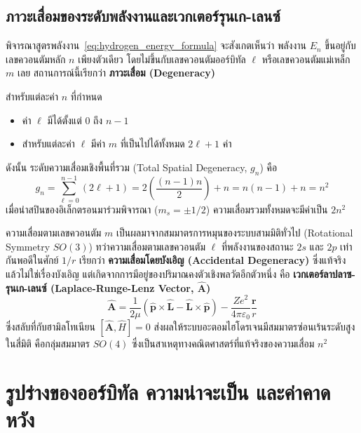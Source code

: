 \subsection{ภาวะเสื่อมของระดับพลังงานและเวกเตอร์รุนเก-เลนซ์}
พิจารณาสูตรพลังงาน~\eqref{eq:hydrogen_energy_formula} จะสังเกตเห็นว่า พลังงาน $E_n$ ขึ้นอยู่กับเลขควอนตัมหลัก $n$ เพียงตัวเดียว โดยไม่ขึ้นกับเลขควอนตัมออร์บิทัล $\ell$ หรือเลขควอนตัมแม่เหล็ก $m$ เลย สถานการณ์นี้เรียกว่า \textbf{ภาวะเสื่อม (Degeneracy)}

สำหรับแต่ละค่า $n$ ที่กำหนด
\begin{itemize}
    \item ค่า $\ell$ มีได้ตั้งแต่ $0$ ถึง $n - 1$
    \item สำหรับแต่ละค่า $\ell$ มีค่า $m$ ที่เป็นไปได้ทั้งหมด $2\ell + 1$ ค่า
\end{itemize}
ดังนั้น ระดับความเสื่อมเชิงพื้นที่รวม (Total Spatial Degeneracy, $g_n$) คือ
\begin{equation}
g_n = \sum_{\ell = 0}^{n - 1} (2\ell + 1) = 2 \left( \frac{(n - 1)n}{2} \right) + n = n(n - 1) + n = n^2
\label{eq:spatial_degeneracy}
\end{equation}
เมื่อนำสปินของอิเล็กตรอนมาร่วมพิจารณา ($m_s = \pm 1/2$) ความเสื่อมรวมทั้งหมดจะมีค่าเป็น $2n^2$

ความเสื่อมตามเลขควอนตัม $m$ เป็นผลมาจากสมมาตรการหมุนของระบบสามมิติทั่วไป (Rotational Symmetry $SO(3)$) ทว่าความเสื่อมตามเลขควอนตัม $\ell$ ที่พลังงานของสถานะ $2s$ และ $2p$ เท่ากันพอดีในศักย์ $1/r$ เรียกว่า \textbf{ความเสื่อมโดยบังเอิญ (Accidental Degeneracy)} ซึ่งแท้จริงแล้วไม่ใช่เรื่องบังเอิญ แต่เกิดจากการมีอยู่ของปริมาณคงตัวเชิงพลวัตอีกตัวหนึ่ง คือ \textbf{เวกเตอร์ลาปลาซ-รุนเก-เลนซ์ (Laplace-Runge-Lenz Vector, $\hat{\mathbf{A}}$)}
\begin{equation}
\hat{\mathbf{A}} = \frac{1}{2\mu} (\hat{\mathbf{p}} \times \hat{\mathbf{L}} - \hat{\mathbf{L}} \times \hat{\mathbf{p}}) - \frac{Ze^2}{4\pi\varepsilon_0} \frac{\mathbf{r}}{r}
\end{equation}
ซึ่งสลับที่กับฮามิลโทเนียน $[\hat{\mathbf{A}}, \hat{H}] = 0$ ส่งผลให้ระบบอะตอมไฮโดรเจนมีสมมาตรซ่อนเร้นระดับสูงในสี่มิติ คือกลุ่มสมมาตร $SO(4)$ ซึ่งเป็นสาเหตุทางคณิตศาสตร์ที่แท้จริงของความเสื่อม $n^2$

\section{รูปร่างของออร์บิทัล ความน่าจะเป็น และค่าคาดหวัง}

